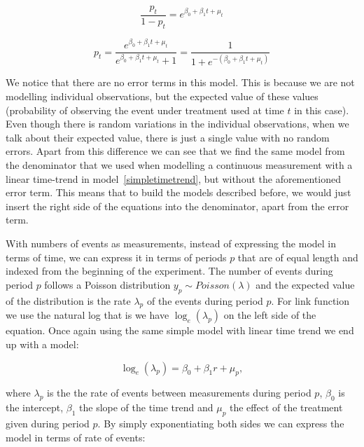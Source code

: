 \documentclass[12pt,a4paper,leqno]{report}
\theoremstyle{plain}
\theoremstyle{definition}
\theoremstyle{remark}
\begin{document}
\begin{def}\label{}
    \begin{equation}\label{}
        \frac{p_t}{1-p_t}=e^{\beta_0 + \beta_1 t + \mu_t}
    \end{equation}
\end{def}

\begin{def}\label{}
    \begin{equation}\label{}
        p_t=\frac{e^{\beta_0 + \beta_1 t + \mu_t}}{e^{\beta_0 + \beta_1 t + \mu_t}+1}=\frac{1}{1+e^{-(\beta_0 + \beta_1 t + \mu_t)}}
    \end{equation}
\end{def}

We notice that there are no error terms in this model. This is because we are not modelling individual observations,
but the expected value of these values (probability of observing the event under treatment used at time \(t\) in this case). Even though there is random variations in
the individual observations, when we talk about their expected value,
there is just a single value with no random errors. Apart from this difference we can see that we find the same model
from the denominator that we used when modelling a continuous measurement with
a linear time-trend in model\ \ref{simpletimetrend}, but without the aforementioned error term.
This means that to build the models described before, we would just insert the right side of the equations
into the denominator, apart from the error term.

With numbers of events as measurements, instead of expressing the model in terms of time, we can
express it in terms of periods \(p\) that are of equal length and indexed from the beginning of the experiment.
The number of events during period \(p\)
follows a Poisson distribution \(y_p \sim Poisson(\lambda)\)
and the expected value of the distribution is the rate \(\lambda_p \) of the events during period \(p\).
For link function we use the natural log
that is we have \(\log_e(\lambda_p)\) on the left side of the equation.
Once again using the same simple model with linear time trend we end up with a model:

\begin{def}\label{oneerror}
    \begin{equation}
        \log_e(\lambda_p)=\beta_0 + \beta_1 r + \mu_{p},
    \end{equation}
\end{def}where \(\lambda_p\) is the the rate of events between measurements during period \(p\),
\(\beta_0\) is the intercept, \(\beta_1\) the slope of the time trend and \(\mu_p\) the
effect of the treatment given during period \(p\). By simply exponentiating both sides
we can express the model in terms of rate of events:
\end{document}
